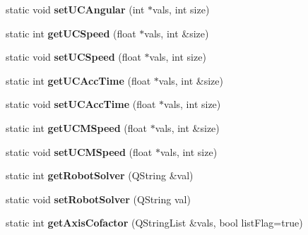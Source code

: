 \begin{DoxyCompactItemize}
\item 
\hypertarget{classRobotConf_abce7c3b744ecfed03dccafe00c434409}{static void {\bfseries set\-U\-C\-Angular} (int $\ast$vals, int size)}\label{classRobotConf_abce7c3b744ecfed03dccafe00c434409}

\item 
\hypertarget{classRobotConf_a61cf238c0c0c814c31db59ac0b329762}{static int {\bfseries get\-U\-C\-Speed} (float $\ast$vals, int \&size)}\label{classRobotConf_a61cf238c0c0c814c31db59ac0b329762}

\item 
\hypertarget{classRobotConf_a56be5ace9289bfca88422dc12799daf9}{static void {\bfseries set\-U\-C\-Speed} (float $\ast$vals, int size)}\label{classRobotConf_a56be5ace9289bfca88422dc12799daf9}

\item 
\hypertarget{classRobotConf_ae9dee68216f4750e4b8a5903bfcf36b4}{static int {\bfseries get\-U\-C\-Acc\-Time} (float $\ast$vals, int \&size)}\label{classRobotConf_ae9dee68216f4750e4b8a5903bfcf36b4}

\item 
\hypertarget{classRobotConf_ae4266ba3ed360b370306d536da53db35}{static void {\bfseries set\-U\-C\-Acc\-Time} (float $\ast$vals, int size)}\label{classRobotConf_ae4266ba3ed360b370306d536da53db35}

\item 
\hypertarget{classRobotConf_ae4c753d443120140b36f2963fdbde75d}{static int {\bfseries get\-U\-C\-M\-Speed} (float $\ast$vals, int \&size)}\label{classRobotConf_ae4c753d443120140b36f2963fdbde75d}

\item 
\hypertarget{classRobotConf_a16f01cf4d058b4c41fd941ff4ffe6213}{static void {\bfseries set\-U\-C\-M\-Speed} (float $\ast$vals, int size)}\label{classRobotConf_a16f01cf4d058b4c41fd941ff4ffe6213}

\item 
\hypertarget{classRobotConf_ab7cb1fa5caebe8cb276eca9ff0f5d1d4}{static int {\bfseries get\-Robot\-Solver} (Q\-String \&val)}\label{classRobotConf_ab7cb1fa5caebe8cb276eca9ff0f5d1d4}

\item 
\hypertarget{classRobotConf_aae333f1aa71a822f7d5776eb269aa494}{static void {\bfseries set\-Robot\-Solver} (Q\-String val)}\label{classRobotConf_aae333f1aa71a822f7d5776eb269aa494}

\item 
\hypertarget{classRobotConf_a488d1025b44ef62c39f1fabebeaeffe7}{static int {\bfseries get\-Axis\-Cofactor} (Q\-String\-List \&vals, bool list\-Flag=true)}\label{classRobotConf_a488d1025b44ef62c39f1fabebeaeffe7}


\end{DoxyCompactItemize}
